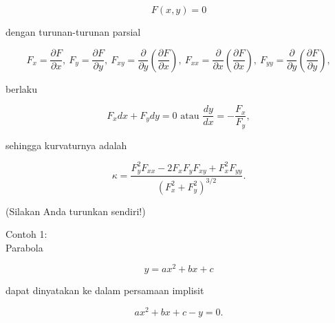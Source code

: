 \documentclass[a4paper,10pt]{article}
\begin{document}
\begin{eulernotebook}
\begin{eulercomment}
\begin{eulercomment}
\begin{eulercomment}
\begin{eulercomment}
\begin{eulercomment}
\end{eulercomment}
\begin{eulerformula}
\[
F(x,y)=0
\]
\end{eulerformula}
\begin{eulercomment}
dengan turunan-turunan parsial

\end{eulercomment}
\begin{eulerformula}
\[
F_x=\frac{\partial F}{\partial x},\ F_y=\frac{\partial F}{\partial y},\ F_{xy}=\frac{\partial}{\partial y}\left(\frac{\partial F}{\partial x}\right),\ F_{xx}=\frac{\partial}{\partial x}\left(\frac{\partial F}{\partial x}\right),\ F_{yy}=\frac{\partial}{\partial y}\left(\frac{\partial F}{\partial y}\right),
\]
\end{eulerformula}
\begin{eulercomment}
berlaku

\end{eulercomment}
\begin{eulerformula}
\[
F_x dx+ F_y dy = 0\text{ atau } \frac{dy}{dx}=-\frac{F_x}{F_y},
\]
\end{eulerformula}
\begin{eulercomment}
sehingga kurvaturnya adalah

\end{eulercomment}
\begin{eulerformula}
\[
\kappa =\frac {F_y^2F_{xx}-2F_xF_yF_{xy}+F_x^2F_{yy}}{\left(F_x^2+F_y^2\right)^{3/2}}.
\]
\end{eulerformula}
\begin{eulercomment}
(Silakan Anda turunkan sendiri!)

Contoh 1:\\
Parabola 

\end{eulercomment}
\begin{eulerformula}
\[
y=ax^2+bx+c
\]
\end{eulerformula}
\begin{eulercomment}
dapat dinyatakan ke dalam persamaan implisit

\end{eulercomment}
\begin{eulerformula}
\[
ax^2+bx+c-y=0.
\]
\end{eulerformula}
\begin{euleroutput}
  

\end{euleroutput}
\end{eulercomment}
\end{eulercomment}
\end{eulercomment}
\end{eulercomment}
\end{eulernotebook}
\end{document}
